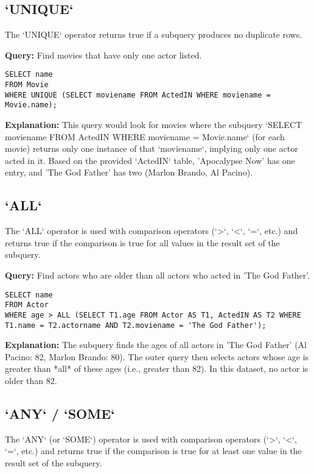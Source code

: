 \documentclass{article}
\begin{document}
\subsection*{`UNIQUE` }
The `UNIQUE` operator returns true if a subquery produces no duplicate rows.

\textbf{Query:} Find movies that have only one actor listed. 
\begin{lstlisting}
SELECT name
FROM Movie
WHERE UNIQUE (SELECT moviename FROM ActedIN WHERE moviename = Movie.name);
\end{lstlisting}
\textbf{Explanation:} This query would look for movies where the subquery `SELECT moviename FROM ActedIN WHERE moviename = Movie.name` (for each movie) returns only one instance of that `moviename`, implying only one actor acted in it. Based on the provided `ActedIN` table, 'Apocalypse Now' has one entry, and 'The God Father' has two (Marlon Brando, Al Pacino).

\subsection*{`ALL` }
The `ALL` operator is used with comparison operators (`>`, `<`, `=`, etc.) and returns true if the comparison is true for all values in the result set of the subquery.

\textbf{Query:} Find actors who are older than all actors who acted in 'The God Father'. 
\begin{lstlisting}
SELECT name
FROM Actor
WHERE age > ALL (SELECT T1.age FROM Actor AS T1, ActedIN AS T2 WHERE T1.name = T2.actorname AND T2.moviename = 'The God Father');
\end{lstlisting}
\textbf{Explanation:} The subquery finds the ages of all actors in 'The God Father' (Al Pacino: 82, Marlon Brando: 80). The outer query then selects actors whose age is greater than *all* of these ages (i.e., greater than 82). In this dataset, no actor is older than 82.

\subsection*{`ANY` / `SOME` }
The `ANY` (or `SOME`) operator is used with comparison operators (`>`, `<`, `=`, etc.) and returns true if the comparison is true for at least one value in the result set of the subquery.
\end{document}
